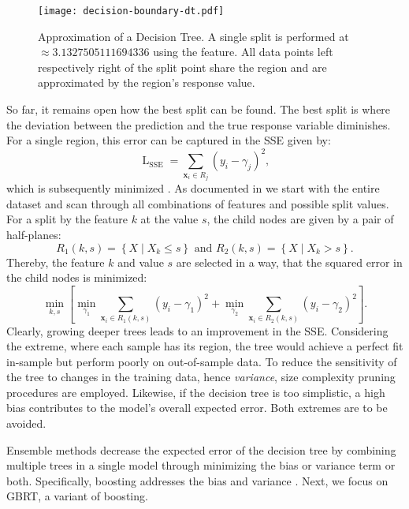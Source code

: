 \begin{figure}[ht]
    \centering
    \texttt{[image: decision-boundary-dt.pdf]}
    \caption[Approximation of Decision Tree]{Approximation of a Decision Tree. A single split is performed at $\approx\num{3.1327505111694336}$ using the feature. All data points left respectively right of the split point share the region and are approximated by the region's response value.}
    \label{fig:decision-boundary-dt}
\end{figure}

So far, it remains open how the best split can be found. The best split is where the deviation between the prediction and the true response variable diminishes. For a single region, this error can be captured in the \gls{SSE} given by:
\begin{equation}
    \operatorname{L}_{\mathrm{SSE}} =\sum_{\mathbf{x}_{i} \in R_j}\left(y_{i}-\gamma_{j}\right)^{2},
\end{equation}
which is subsequently minimized \autocite[][231]{breimanClassificationRegressionTrees2017}. As documented in \textcite[][307]{hastietrevorElementsStatisticalLearning2009} we start with the entire dataset and scan through all combinations of features and possible split values. For a split by the feature $k$ at the value $s$, the child nodes are given by a pair of half-planes:
\begin{equation}
    R_1(k, s)=\left\{X \mid X_k \leq s\right\} \text { and } R_2(k, s)=\left\{X \mid X_k>s\right\}.
\end{equation}
Thereby, the feature $k$ and value $s$ are selected in a way, that the squared error in the child nodes is minimized:
\begin{equation}
    \min _{k, s}\left[\min _{\gamma_1} \sum_{\mathbf{x}_i \in R_1(k, s)}\left(y_i-\gamma_1\right)^2+\min _{\gamma_2} \sum_{\mathbf{x}_i \in R_2(k, s)}\left(y_i-\gamma_2\right)^2\right].
\end{equation}
Clearly, growing deeper trees leads to an improvement in the \gls{SSE}. Considering the extreme, where each sample has its region, the tree would achieve a perfect fit in-sample but perform poorly on out-of-sample data. To reduce the sensitivity of the tree to changes in the training data, hence \emph{variance}, size complexity pruning procedures are employed. Likewise, if the decision tree is too simplistic, a high bias contributes to the model's overall expected error. Both extremes are to be avoided.

Ensemble methods decrease the expected error of the decision tree by combining multiple trees in a single model through minimizing the bias or variance term or both. Specifically, boosting addresses the bias and variance \autocites[][1672]{schapireBoostingMarginNew1998}[][29]{breimanRandomForests2001}. Next, we focus on \gls{GBRT}, a variant of boosting.


